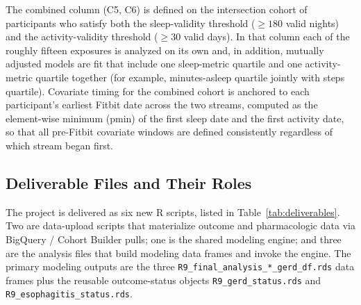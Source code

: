 \documentclass[11pt]{article}
\newcommand{\code}[1]{\texttt{\small #1}}
\begin{document}
The combined column (C5, C6) is defined on the intersection cohort of participants who satisfy both
the sleep-validity threshold ($\geq 180$ valid nights) and the activity-validity threshold
($\geq 30$ valid days). In that column each of the roughly fifteen exposures is analyzed on its own
and, in addition, mutually adjusted models are fit that include one sleep-metric quartile and one
activity-metric quartile together (for example, minutes-asleep quartile jointly with steps quartile).
Covariate timing for the combined cohort is anchored to each participant's earliest Fitbit date across
the two streams, computed as the element-wise minimum ($\mathrm{pmin}$) of the first sleep date and
the first activity date, so that all pre-Fitbit covariate windows are defined consistently regardless
of which stream began first.

\subsection{Deliverable Files and Their Roles}

The project is delivered as six new R scripts, listed in Table~\ref{tab:deliverables}. Two are
data-upload scripts that materialize outcome and pharmacologic data via BigQuery / Cohort Builder
pulls; one is the shared modeling engine; and three are the analysis files that build modeling data
frames and invoke the engine. The primary modeling outputs are the three
\code{R9_final_analysis_*_gerd_df.rds} data frames plus the reusable outcome-status objects
\code{R9_gerd_status.rds} and \code{R9_esophagitis_status.rds}.
\end{document}
